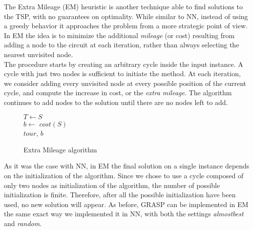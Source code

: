 The Extra Mileage (EM) heuristic is another technique able to find solutions to the TSP, with no guarantees on optimality.
While similar to NN, instead of using a greedy behavior it approaches the problem from a more strategic point of view. 
In EM the idea is to minimize the additional \textit{mileage} (or cost) resulting from adding a node to the circuit at each iteration, rather than always selecting the nearest unvisited node.\\
The procedure starts by creating an arbitrary cycle inside the input instance.
A cycle with just two nodes is sufficient to initiate the method.
At each iteration, we consider adding every unvisited node at every possible position of the current cycle, and compute the increase in cost, or the \textit{extra mileage}.
The algorithm continues to add nodes to the solution until there are no nodes left to add.
\\
\begin{figure}[htbp]
    \begin{algorithm}[H]
        \BlankLine
        $T \gets S$\\
        $b \gets$ $cost(S)$\\
        \Return $tour$, $b$\\
        
    \end{algorithm}
    \caption{Extra Mileage algorithm}
\end{figure}

As it was the case with NN, in EM the final solution on a single instance depends on the initialization of the algorithm.
Since we chose to use a cycle composed of only two nodes as initialization of the algorithm, the number of possible initialization is finite.
Therefore, after all the possible initialization have been used, no new solution will appear.
As before, GRASP can be implemented in EM the same exact way we implemented it in NN, with both the settings \textit{almostbest} and \textit{random}.

